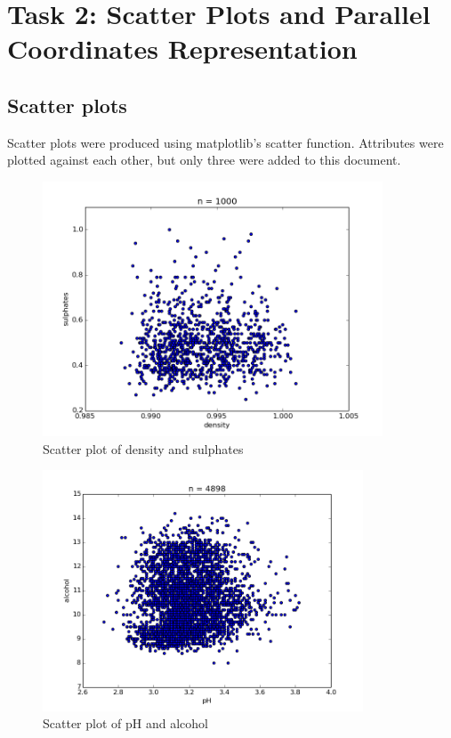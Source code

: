 \documentclass[12pt]{article}
\begin{document}
\section{Task 2: Scatter Plots and Parallel Coordinates Representation}

\subsection{Scatter plots}

Scatter plots were produced using matplotlib's scatter function. Attributes were plotted against each other, but only three were added to this document.

\begin{figure}[H]
    \centering
    \includegraphics[width=0.9\textwidth]{scatter_plot_density_sulphates}
    \caption{Scatter plot of density and sulphates}
    \label{fig:scatter_dens_sulph}
\end{figure}

\begin{figure}[H]
    \centering
    \includegraphics[width=0.85\textwidth]{scatter_plot_pH_alcohol}
    \caption{Scatter plot of pH and alcohol}
    \label{fig:scatter_ph_alc}
\end{figure}
\end{document}
